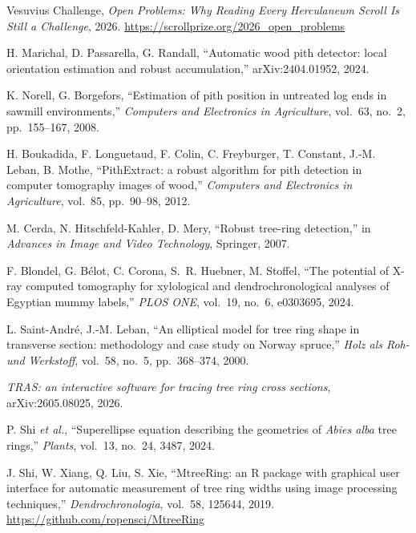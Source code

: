 
 Vesuvius Challenge, \emph{Open Problems: Why Reading Every Herculaneum Scroll Is Still a
  Challenge}, 2026. \url{https://scrollprize.org/2026_open_problems}

 H. Marichal, D. Passarella, G. Randall, ``Automatic wood pith detector: local
  orientation estimation and robust accumulation,'' arXiv:2404.01952, 2024.

 K. Norell, G. Borgefors, ``Estimation of pith position in untreated log
  ends in sawmill environments,'' \emph{Computers and Electronics in Agriculture}, vol.~63,
  no.~2, pp.~155--167, 2008.

 H. Boukadida, F. Longuetaud, F. Colin, C. Freyburger, T. Constant,
  J.-M. Leban, B. Mothe, ``PithExtract: a robust algorithm for pith detection in computer
  tomography images of wood,'' \emph{Computers and Electronics in Agriculture}, vol.~85,
  pp.~90--98, 2012.

 M. Cerda, N. Hitschfeld-Kahler, D. Mery, ``Robust tree-ring detection,''
  in \emph{Advances in Image and Video Technology}, Springer, 2007.

 F. Blondel, G. B\'elot, C. Corona, S.~R. Huebner, M. Stoffel, ``The
  potential of X-ray computed tomography for xylological and dendrochronological analyses of
  Egyptian mummy labels,'' \emph{PLOS ONE}, vol.~19, no.~6, e0303695, 2024.

 L. Saint-Andr\'e, J.-M. Leban, ``An elliptical model for tree ring
  shape in transverse section: methodology and case study on Norway spruce,'' \emph{Holz als
  Roh- und Werkstoff}, vol.~58, no.~5, pp.~368--374, 2000.

 \emph{TRAS: an interactive software for tracing tree ring cross sections},
  arXiv:2605.08025, 2026.

 P. Shi \emph{et al.}, ``Superellipse equation describing the
  geometries of \emph{Abies alba} tree rings,'' \emph{Plants}, vol.~13, no.~24, 3487, 2024.

 J. Shi, W. Xiang, Q. Liu, S. Xie, ``MtreeRing: an R package with graphical
  user interface for automatic measurement of tree ring widths using image processing
  techniques,'' \emph{Dendrochronologia}, vol.~58, 125644, 2019.
  \url{https://github.com/ropensci/MtreeRing}

